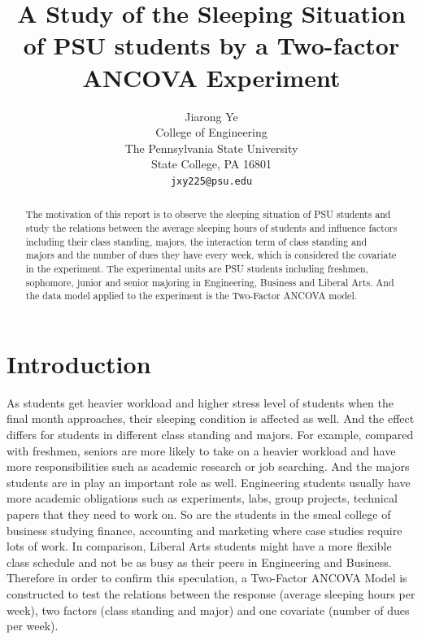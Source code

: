\documentclass{article} %
\title{A Study of the Sleeping Situation of PSU students by  a Two-factor ANCOVA Experiment}
\author{
Jiarong Ye \\
College of Engineering\\
The Pennsylvania State University\\
State College, PA 16801 \\
\texttt{jxy225@psu.edu} \\
}
\begin{document}
\maketitle

\begin{abstract}
The motivation of this report is to observe the sleeping situation of PSU students and study the relations between the average sleeping hours of students and influence factors including their class standing, majors, the interaction term of class standing and majors and the number of dues they have every week, which is considered the covariate in the experiment. The experimental units are PSU students including freshmen, sophomore, junior and senior majoring in Engineering, Business and Liberal Arts. And the data model applied to the experiment is the Two-Factor ANCOVA model.

\end{abstract}

\section{Introduction}



As students get heavier workload and higher stress level of students when the final month approaches, their sleeping condition is affected as well. And the effect differs for students in different class standing and majors. For example, compared with freshmen, seniors are more likely to take on a heavier workload and have more responsibilities such as academic research or job searching. And the majors students are in play an important role as well. Engineering students usually have more academic obligations such as experiments, labs, group projects, technical papers that they need  to work on. So are the students in the smeal college of business studying finance, accounting and marketing where case studies require lots of work. In comparison, Liberal Arts students might have a more flexible class schedule and not be as busy as their peers in Engineering and Business. Therefore in order to confirm this speculation, a Two-Factor ANCOVA Model is constructed to test the relations between the response (average sleeping hours per week), two factors (class standing and major) and one covariate (number of dues per week). 
\end{document}
